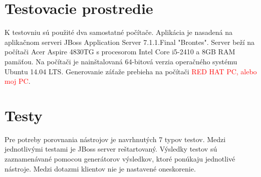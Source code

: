 \documentclass[12pt,oneside,final]{fithesis-utf8}
\newcommand\todo[1]{\textcolor{red}{#1}}
\begin{document}
\section{Testovacie prostredie}
K testovniu sú použité dva samostatné počítače. Aplikácia je nasadená na aplikačnom serveri JBoss Application Server 7.1.1.Final "{}Brontes". Server beží na počítači Acer Aspire 4830TG s procesorom Intel Core i5-2410 a 8GB RAM pamäťou. Na počítači je nainštalovaná 64-bitová verzia operačného systému Ubuntu 14.04 LTS. Generovanie záťaže prebieha na počítači \todo{RED HAT PC, alebo moj PC}.

\newpage
\section{Testy}
Pre potreby porovnania nástrojov je navrhnutých 7 typov testov. Medzi jednotlivými testami je JBoss server reštartovaný. Výsledky testov sú zaznamenávané pomocou generátorov výsledkov, ktoré ponúkaju jednotlivé nástroje. Medzi dotazmi klientov nie je nastavené oneskorenie.
\newline
\end{document}
